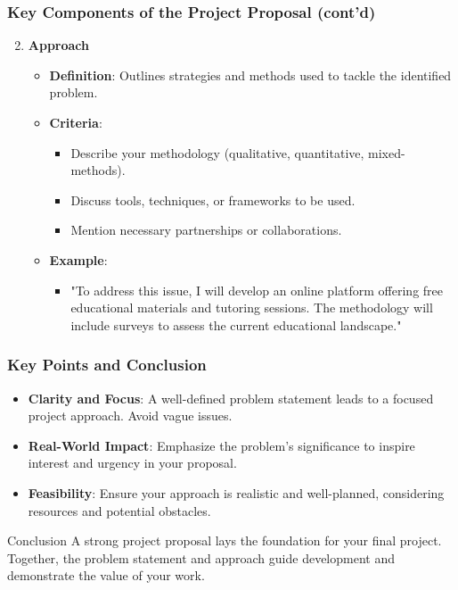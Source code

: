 \documentclass[aspectratio=169]{beamer}
\begin{document}
\begin{frame}[fragile]
    \frametitle{Key Components of the Project Proposal (cont'd)}
    \begin{enumerate}
        \setcounter{enumi}{1}
        \item \textbf{Approach}
        \begin{itemize}
            \item \textbf{Definition}: Outlines strategies and methods used to tackle the identified problem.
            \item \textbf{Criteria}:
            \begin{itemize}
                \item Describe your methodology (qualitative, quantitative, mixed-methods).
                \item Discuss tools, techniques, or frameworks to be used.
                \item Mention necessary partnerships or collaborations.
            \end{itemize}
            \item \textbf{Example}:
            \begin{itemize}
                \item "To address this issue, I will develop an online platform offering free educational materials and tutoring sessions. The methodology will include surveys to assess the current educational landscape."
            \end{itemize}
        \end{itemize}
    \end{enumerate} 
\end{frame}

\begin{frame}[fragile]
    \frametitle{Key Points and Conclusion}
    \begin{itemize}
        \item \textbf{Clarity and Focus}: A well-defined problem statement leads to a focused project approach. Avoid vague issues.
        \item \textbf{Real-World Impact}: Emphasize the problem’s significance to inspire interest and urgency in your proposal.
        \item \textbf{Feasibility}: Ensure your approach is realistic and well-planned, considering resources and potential obstacles.
    \end{itemize}
    
    \begin{block}{Conclusion}
        A strong project proposal lays the foundation for your final project. Together, the problem statement and approach guide development and demonstrate the value of your work.
    \end{block}
\end{frame}
\end{document}
